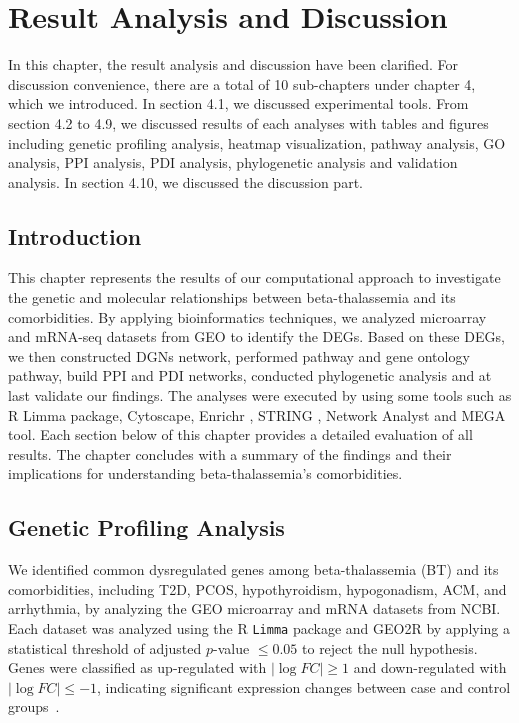 %
%
\let\textcircled=\pgftextcircled
\chapter{Result Analysis and Discussion}
\label{chap:implementation}
In this chapter, the result analysis and discussion have been clarified. For discussion convenience, there are a total of 10 sub-chapters under chapter 4, which we introduced. In section 4.1, we discussed experimental tools. From section 4.2 to 4.9, we discussed results of each analyses with tables and figures including genetic profiling analysis, heatmap visualization, pathway analysis, GO analysis, PPI analysis, PDI analysis, phylogenetic analysis and validation analysis. In section 4.10, we discussed the discussion part.

\vspace{150mm}

\section{Introduction}
\label{sec:sec4_1}
This chapter represents the results of our computational approach to investigate the genetic and molecular relationships between beta-thalassemia and its comorbidities. By applying bioinformatics techniques, we analyzed microarray and mRNA-seq datasets from GEO to identify the DEGs. Based on these DEGs, we then constructed DGNs network, performed pathway and gene ontology pathway, build PPI and PDI networks, conducted phylogenetic analysis and at last validate our findings. The analyses were executed by using some tools such as R Limma package, Cytoscape, Enrichr \cite{b15}, STRING \cite{b15}, Network Analyst \cite{b15} and MEGA tool. Each section below of this chapter provides a detailed evaluation of all results. The chapter concludes with a summary of the findings and their implications for understanding beta-thalassemia's comorbidities.


\section{Genetic Profiling Analysis}
\label{sec:sec4_2}

We identified common dysregulated genes among beta-thalassemia (BT) and its comorbidities, including T2D, PCOS, hypothyroidism, hypogonadism, ACM, and arrhythmia, by analyzing the GEO microarray and mRNA datasets from NCBI. Each dataset was analyzed using the R \texttt{Limma} package and GEO2R by applying a statistical threshold of adjusted \( p \)-value \( \leq 0.05 \) to reject the null hypothesis. Genes were classified as up-regulated with \( \left| \log FC \right| \geq 1 \) and down-regulated with \( \left| \log FC \right| \leq -1 \), indicating significant expression changes between case and control groups~\cite{b4}.

